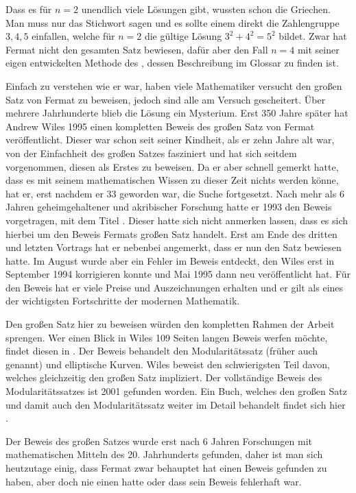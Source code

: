 Dass es für $n = 2$ unendlich viele Lösungen gibt, wussten schon die Griechen. Man muss nur das Stichwort  sagen und es sollte einem direkt die Zahlengruppe $3,4,5$ einfallen, welche für $n = 2$ die gültige Lösung $3^2 + 4^2 = 5^2$ bildet. Zwar hat Fermat nicht den gesamten Satz bewiesen, dafür aber den Fall $n = 4$ mit seiner eigen entwickelten Methode des , dessen Beschreibung im Glossar zu finden ist.

Einfach zu verstehen wie er war, haben viele Mathematiker versucht den großen Satz von Fermat zu beweisen, jedoch sind alle am Versuch gescheitert. Über mehrere Jahrhunderte blieb die Lösung ein Mysterium. Erst 350 Jahre später hat Andrew Wiles 1995 einen kompletten Beweis des großen Satz von Fermat veröffentlicht. Dieser war schon seit seiner Kindheit, als er zehn Jahre alt war, von der Einfachheit des großen Satzes fasziniert und hat sich seitdem vorgenommen, diesen als Erstes zu beweisen. Da er aber schnell gemerkt hatte, dass es mit seinem mathematischen Wissen zu dieser Zeit nichts werden könne, hat er, erst nachdem er 33 geworden war, die Suche fortgesetzt. Nach mehr als 6 Jahren geheimgehaltener und akribischer Forschung hatte er 1993 den Beweis vorgetragen, mit dem Titel . Dieser hatte sich nicht anmerken lassen, dass es sich hierbei um den Beweis Fermats großen Satz handelt. Erst am Ende des dritten und letzten Vortrags hat er nebenbei angemerkt, dass er nun den Satz bewiesen hatte. \cite{newYorkTimes} Im August wurde aber ein Fehler im Beweis entdeckt, den Wiles erst in September 1994 korrigieren konnte und Mai 1995 dann neu veröffentlicht hat. Für den Beweis hat er viele Preise und Auszeichnungen erhalten und er gilt als eines der wichtigsten Fortschritte der modernen Mathematik.

Den großen Satz hier zu beweisen würden den kompletten Rahmen der Arbeit sprengen. Wer einen Blick in Wiles 109 Seiten langen Beweis werfen möchte, findet diesen in \cite{wilesFermat}. Der Beweis behandelt den Modularitätssatz (früher auch  genannt) und elliptische Kurven. Wiles beweist den schwierigsten Teil davon, welches gleichzeitig den großen Satz impliziert. Der vollständige Beweis des Modularitätssatzes ist 2001 gefunden worden. Ein Buch, welches den großen Satz und damit auch den Modularitätssatz weiter im Detail behandelt findet sich hier \cite{darmon}.

Der Beweis des großen Satzes wurde erst nach 6 Jahren Forschungen mit mathematischen Mitteln des 20. Jahrhunderts gefunden, daher ist man sich heutzutage einig, dass Fermat zwar behauptet hat einen Beweis gefunden zu haben, aber doch nie einen hatte oder dass sein Beweis fehlerhaft war.
